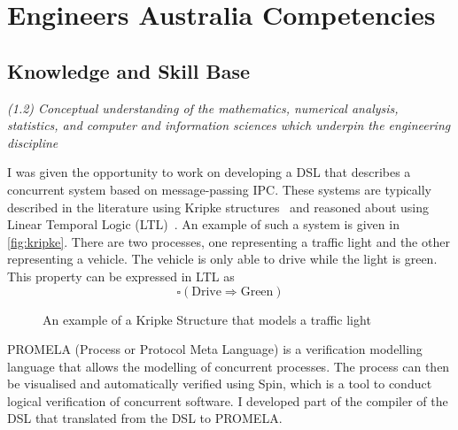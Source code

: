 \documentclass{report}
\begin{document}
\chapter{Engineers Australia Competencies}
\section{Knowledge and Skill Base}
\textit{(1.2) Conceptual understanding of the mathematics, numerical analysis, statistics, and
computer and information sciences which underpin the engineering discipline}

I was given the opportunity to work on developing a DSL that describes a concurrent system based on
message-passing IPC. These systems are typically described in the literature using Kripke 
structures~\citep{kripke}
and reasoned about using Linear Temporal Logic (LTL)~\citep{Pnueli}. An example of such a system is 
given in \autoref{fig:kripke}.
There are two processes, one representing a traffic light and the other representing a vehicle.
The vehicle is only able to drive while the light is green. This property can be expressed in LTL as
$$\square (\text{Drive}\Rightarrow \text{Green})$$

\begin{figure}
\caption{An example of a Kripke Structure that models a traffic light}
\label{fig:kripke}
\end{figure}
PROMELA (Process or Protocol Meta Language) is a verification modelling language that allows the
modelling of concurrent processes. The process can then be visualised and automatically verified
using Spin, which is a tool to conduct logical verification of concurrent software.  
I developed part of the compiler of the DSL that translated from the DSL to PROMELA. 
\end{document}
